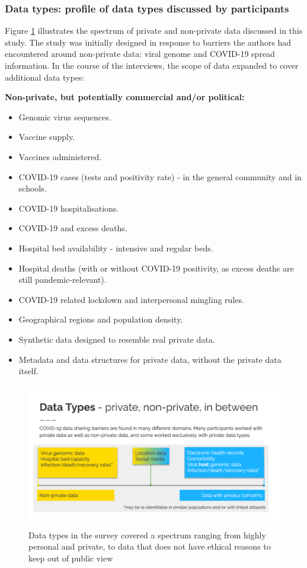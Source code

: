 \documentclass{CUP-JNL-DAP}%
\begin{document}
\subsubsection{Data types: profile of data types discussed by participants}

Figure \ref{fig:fig-datatypes} illustrates the spectrum of private and non-private data discussed in this study. The study was initially designed in response to barriers the authors had encountered around non-private data: viral genome and COVID-19 spread information. In the course of the interviews, the scope of data expanded to cover additional data types: 

\textbf{Non-private, but potentially commercial and/or political:}
\begin{itemize}
\item Genomic virus sequences.
\item Vaccine supply.
\item Vaccines administered.
\item COVID-19 cases (tests and positivity rate) - in the general community and in schools.
\item COVID-19 hospitalisations.
\item COVID-19 and excess deaths.
\item Hospital bed availability - intensive and regular beds.
\item Hospital deaths (with or without COVID-19 positivity, as excess deaths are still pandemic-relevant).
\item COVID-19 related lockdown and interpersonal mingling rules.
\item Geographical regions and population density.
\item Synthetic data designed to resemble real private data.
\item Metadata and data structures for private data, without the private data itself. 
\end{itemize}

\begin{figure}
    \centering
    \includegraphics[width=1\linewidth]{figures/figure-datatypes.png}
    \caption{Data types in the survey covered a spectrum ranging from highly personal and private, to data that does not have ethical reasons to keep out of public view}
    \label{fig:fig-datatypes}
\end{figure}
\end{document}
